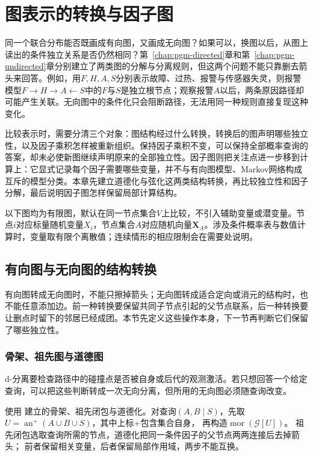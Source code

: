 \chapter{图表示的转换与因子图}
\label{chap:pgm-representations}

同一个联合分布能否既画成有向图，又画成无向图？如果可以，换图以后，从图上读出的条件独立关系是否仍然相同？第~\ref{chap:pgm-directed}章和第~\ref{chap:pgm-undirected}章分别建立了两类图的分解与分离规则，但这两个问题不能只靠删去箭头来回答。例如，用$F,H,A,S$分别表示故障、过热、报警与传感器失灵，则报警模型$F\to H\to A\leftarrow S$中的$F$与$S$是独立根节点；观察报警$A$以后，两条原因路径却可能产生关联。无向图中的条件化只会阻断路径，无法用同一种规则直接复现这种变化。

比较表示时，需要分清三个对象：图结构经过什么转换，转换后的图声明哪些独立性，以及因子乘积怎样被重新组织。保持因子乘积不变，可以保持全部概率查询的答案，却未必使新图继续声明原来的全部独立性。因子图则把关注点进一步移到计算上：它显式记录每个因子需要哪些变量，并不与有向图模型、Markov网络构成互斥的模型分类。本章先建立道德化与弦化这两类结构转换，再比较独立性和因子分解，最后说明因子图怎样保留局部计算结构。

以下图均为有限图，默认在同一节点集合$V$上比较，不引入辅助变量或潜变量。节点$i$对应标量随机变量$X_i$，节点集合$A$对应随机向量$\bm{X}_A$。涉及条件概率表与数值计算时，变量取有限个离散值；连续情形的相应限制会在需要处说明。

\section{有向图与无向图的结构转换}
\label{sec:pgm-representations-structural-conversions}

有向图转成无向图时，不能只擦掉箭头；无向图转成适合定向或消元的结构时，也不能任意添加边。前一种转换要保留共同子节点引起的父节点联系，后一种转换要让删点时留下的邻居已经成团。本节先定义这些操作本身，下一节再判断它们保留了哪些独立性。

\subsection{骨架、祖先图与道德图}
\label{sec:pgm-representations-ancestral-graphs}

d-分离要检查路径中的碰撞点是否被自身或后代的观测激活。若只想回答一个给定查询，可以把这些判断转成一次无向分离，但所用的无向图必须随查询改变。

使用
建立的骨架、祖先闭包与道德化。对查询$(A,B\mid S)$，先取
$U=\operatorname{an}^{+}(A\cup B\cup S)$，其中上标$+$包含集合自身，
再构造$\operatorname{mor}(\mathcal G[U])$。
祖先闭包选取查询所需的节点，道德化把同一条件因子的父节点两两连接后去掉箭头；
前者保留相关变量，后者保留局部作用域，两步不能互换。

